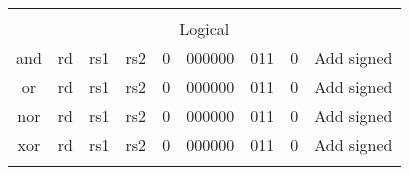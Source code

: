 \documentclass{article}
\begin{document}
\begin{center}
\begin{longtable}{|c|l|r|l|r|l|r|l|r|l|r|l|r|c|c|}
    \hline          \multicolumn{15}{|c|}{} \\
    
                    \multicolumn{15}{|c|}{Logical} \\   
    \hline and  &   \multicolumn{2}{|c|}{rd}            &   \multicolumn{2}{|c|}{rs1}       &   \multicolumn{2}{|c|}{rs2}           &   \multicolumn{2}{|c|}{0}             &   \multicolumn{2}{|c|}{000000}    &   \multicolumn{2}{|c|}{011}       &   0       &   Add signed \\
    \hline or   &   \multicolumn{2}{|c|}{rd}            &   \multicolumn{2}{|c|}{rs1}       &   \multicolumn{2}{|c|}{rs2}           &   \multicolumn{2}{|c|}{0}             &   \multicolumn{2}{|c|}{000000}    &   \multicolumn{2}{|c|}{011}       &   0       &   Add signed \\
    \hline nor  &   \multicolumn{2}{|c|}{rd}            &   \multicolumn{2}{|c|}{rs1}       &   \multicolumn{2}{|c|}{rs2}           &   \multicolumn{2}{|c|}{0}             &   \multicolumn{2}{|c|}{000000}    &   \multicolumn{2}{|c|}{011}       &   0       &   Add signed \\
    \hline xor  &   \multicolumn{2}{|c|}{rd}            &   \multicolumn{2}{|c|}{rs1}       &   \multicolumn{2}{|c|}{rs2}           &   \multicolumn{2}{|c|}{0}             &   \multicolumn{2}{|c|}{000000}    &   \multicolumn{2}{|c|}{011}       &   0       &   Add signed \\


    \hline          \multicolumn{15}{|c|}{} \\
    

\end{longtable}
\end{center}
\end{document}

